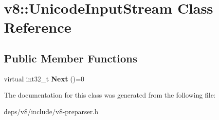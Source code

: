 \hypertarget{classv8_1_1_unicode_input_stream}{}\section{v8\+:\+:Unicode\+Input\+Stream Class Reference}
\label{classv8_1_1_unicode_input_stream}
\subsection*{Public Member Functions}
\begin{DoxyCompactItemize}
\item 
\hypertarget{classv8_1_1_unicode_input_stream_a040b55d2dc511c4b2a96c7f530cd4f98}{}virtual int32\+\_\+t {\bfseries Next} ()=0\label{classv8_1_1_unicode_input_stream_a040b55d2dc511c4b2a96c7f530cd4f98}

\end{DoxyCompactItemize}


The documentation for this class was generated from the following file\+:\begin{DoxyCompactItemize}
\item 
deps/v8/include/v8-\/preparser.\+h\end{DoxyCompactItemize}

